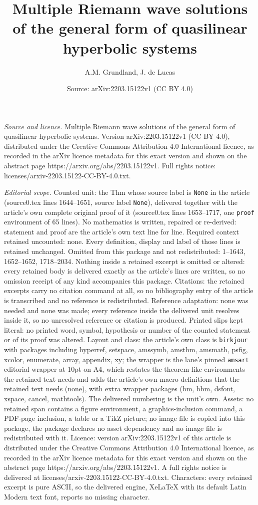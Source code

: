 \documentclass[10pt,a4paper]{amsart}
\title[Multiple Riemann wave solutions of the general form of quasi]{Multiple Riemann wave solutions of the general form of quasilinear hyperbolic systems}
\author{A.M. Grundland, J. de Lucas}
\date{Source: arXiv:2203.15122v1 (CC BY 4.0)}
\begin{document}
\maketitle

\noindent\emph{Source and licence.} Multiple Riemann wave solutions of the general form of quasilinear hyperbolic systems. Version arXiv:2203.15122v1 (CC BY 4.0), distributed under the Creative Commons Attribution 4.0 International licence, as recorded in the arXiv licence metadata for this exact version and shown on the abstract page https://arxiv.org/abs/2203.15122v1. Full rights notice: licenses/arxiv-2203.15122-CC-BY-4.0.txt.\par\smallskip

\noindent\textit{Editorial scope.} Counted unit: the Thm whose source label is \texttt{None} in the article (source0.tex lines 1644--1651, source label \texttt{None}), delivered together with the article's own complete original proof of it (source0.tex lines 1653--1717, one \texttt{proof} environment of 65 lines). No mathematics is written, repaired or re-derived: statement and proof are the article's own text line for line. Required context retained uncounted: none. Every definition, display and label of those lines is retained unchanged. Omitted from this package and not redistributed: 1--1643, 1652--1652, 1718--2034. Nothing inside a retained excerpt is omitted or altered: every retained body is delivered exactly as the article's lines are written, so no omission receipt of any kind accompanies this package. Citations: the retained excerpts carry no citation command at all, so no bibliography entry of the article is transcribed and no reference is redistributed. Reference adaptation: none was needed and none was made; every reference inside the delivered unit resolves inside it, so no unresolved reference or citation is produced. Printed slips kept literal: no printed word, symbol, hypothesis or number of the counted statement or of its proof was altered. Layout and class: the article's own class is \texttt{birkjour} with packages including hyperref, setspace, amssymb, amsthm, amsmath, psfig, xcolor, enumerate, array, appendix, xy; the wrapper is the lane's pinned \texttt{amsart} editorial wrapper at 10pt on A4, which restates the theorem-like environments the retained text needs and adds the article's own macro definitions that the retained text needs (none), with extra wrapper packages (bm, bbm, dsfont, xspace, cancel, mathtools). The delivered numbering is the unit's own. Assets: no retained span contains a figure environment, a graphics-inclusion command, a PDF-page inclusion, a table or a TikZ picture; no image file is copied into this package, the package declares no asset dependency and no image file is redistributed with it. Licence: version arXiv:2203.15122v1 of this article is distributed under the Creative Commons Attribution 4.0 International licence, as recorded in the arXiv licence metadata for this exact version and shown on the abstract page https://arxiv.org/abs/2203.15122v1. A full rights notice is delivered at licenses/arxiv-2203.15122-CC-BY-4.0.txt. Characters: every retained excerpt is pure ASCII, so the delivered engine, XeLaTeX with its default Latin Modern text font, reports no missing character.
\end{document}
